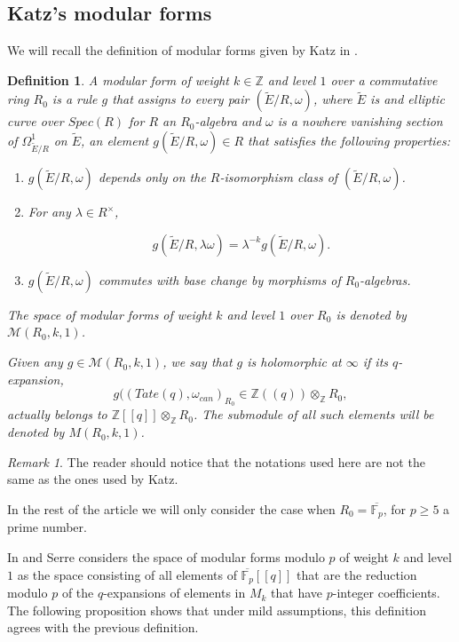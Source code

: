 \documentclass[13pt]{amsart}
\newtheorem{definition}[theorem]{Definition}
\theoremstyle{remark}
\newtheorem*{remark}{Remark}
\numberwithin{theorem}{section} \numberwithin{equation}{section}
\begin{document}
\subsection{ Katz's modular forms}
We will recall the definition of modular forms given by Katz in \cite{Katz1}. 
\begin{definition}  \label{def:Katzmodularforms}
A modular form of weight $k \in {\mathbb{Z}}$ and level $1$ over a commutative ring
$R_{0}$ is a rule $g$ that assigns to every pair $(\tilde{E}/R, \omega)$, where 
$\tilde{E}$ is and elliptic
curve over $Spec(R)$ for $R$ an $R_{0}$-algebra and $\omega$ is a nowhere vanishing section of $\Omega^{1}_{\tilde{E}/R}$ on $\tilde{E}$, an element $g(\tilde{E}/R,\omega) \in R$
that satisfies the following properties:

\begin{enumerate}
 \item $g(\tilde{E}/R,\omega)$ depends only on the $R$-isomorphism class of $(\tilde{E}/R,\omega)$.
 \item For any $\lambda \in R^{\times}$, 
 
 \[g(\tilde{E}/R,\lambda \omega)=\lambda^{-k} g(\tilde{E}/R,\omega) .\]
 
 \item $g(\tilde{E}/R,\omega)$ commutes with base change by morphisms of $R_{0}$-algebras.
\end{enumerate}

The space of modular forms of weight $k$ and level $1$ over $R_{0}$ is denoted by $\mathcal{M}(R_{0},k,1)$.

Given any $g \in \mathcal{M}(R_{0},k,1)$, we say that $g$ is holomorphic at 
$\infty$ if its $q$-expansion,  
\[g((Tate(q),\omega_{can})_{R_{0}} \in {\mathbb{Z}}((q))\otimes_{\mathbb{Z}} R_{0} ,\]
actually belongs to ${\mathbb{Z}}[[q]]\otimes_{\mathbb{Z}} R_{0}$. The submodule of all such 
elements will be denoted by $M(R_{0},k,1)$.

\end{definition}

\begin{remark}
 The reader should notice that the notations used here are not the same as the 
ones used by Katz.
\end{remark}

In the rest of the article we will only consider the case when $R_{0}=\overline{\mathbb{F}_p}$, for $p \ge 5$ a prime number.

In \cite{Ser} and \cite{Ser2} Serre considers the space  of modular forms modulo $p$ of weight $k$ and level $1$  as the space consisting of all elements of $\overline{\mathbb{F}_p}[[q]]$ that are the reduction modulo $p$ of the $q$-expansions  of elements in $M_{k}$ that have $p$-integer coefficients. The following proposition shows that under mild assumptions, this definition agrees with the previous definition.
\end{document}
